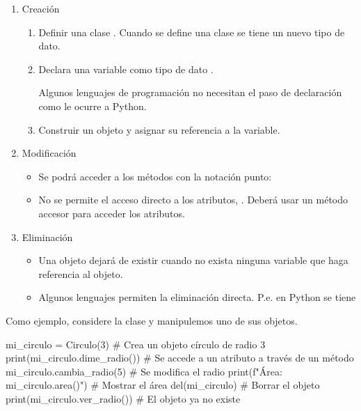 \begin{enumerate}
\item Creación

\begin{enumerate}
\item 
Definir una clase . Cuando se define una clase se tiene un nuevo tipo de dato.

\item 
Declara una variable  como tipo de dato .

Algunos lenguajes de programación no necesitan el paso de declaración como le ocurre a Python.

\item 
Construir un objeto y asignar su referencia a la variable.
\end{enumerate}

\item Modificación
\begin{itemize}
\item Se podrá acceder a los métodos con la notación punto: 

\item No se permite el acceso directo a los atributos, . Deberá usar un método accesor para acceder los atributos.
\end{itemize}

	
\item Eliminación

\begin{itemize}
\item Una objeto dejará de existir cuando no exista ninguna variable  que haga referencia al objeto.

\item Algunos lenguajes permiten la eliminación directa. P.e. en Python se tiene \end{itemize}


\end{enumerate}



Como ejemplo, considere la clase  y manipulemos uno de sus objetos. 
\begin{pyconsole}[][frame=single]
mi_circulo = Circulo(3)         # Crea un objeto círculo de radio 3
print(mi_circulo.dime_radio())   # Se accede a un atributo a través de un método
mi_circulo.cambia_radio(5)      # Se modifica el radio
print(f"Área: {mi_circulo.area()}") # Mostrar el área
del(mi_circulo)                 # Borrar el objeto
print(mi_circulo.ver_radio())   # El objeto ya no existe
\end{pyconsole}

